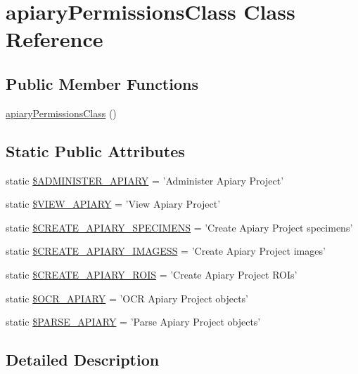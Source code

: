 \hypertarget{classapiary_permissions_class}{
\section{apiaryPermissionsClass Class Reference}
\label{classapiary_permissions_class}
}
\subsection*{Public Member Functions}
\begin{DoxyCompactItemize}
\item 
\hyperlink{classapiary_permissions_class_a2f94ec91307bd261e9f1b11ab53232b1}{apiaryPermissionsClass} ()
\end{DoxyCompactItemize}
\subsection*{Static Public Attributes}
\begin{DoxyCompactItemize}
\item 
static \hyperlink{classapiary_permissions_class_af44ec5d3163f4fde9dd5974c643d7cba}{\$ADMINISTER\_\-APIARY} = 'Administer Apiary Project'
\item 
static \hyperlink{classapiary_permissions_class_a37d9d8b791e84a572596899b5bd45e6b}{\$VIEW\_\-APIARY} = 'View Apiary Project'
\item 
static \hyperlink{classapiary_permissions_class_af8d6246e918ba9bf893ad8853638c846}{\$CREATE\_\-APIARY\_\-SPECIMENS} = 'Create Apiary Project specimens'
\item 
static \hyperlink{classapiary_permissions_class_ab519fecad8358f808167dbf208b37756}{\$CREATE\_\-APIARY\_\-IMAGESS} = 'Create Apiary Project images'
\item 
static \hyperlink{classapiary_permissions_class_a0569a7962c52e670222700a92386363c}{\$CREATE\_\-APIARY\_\-ROIS} = 'Create Apiary Project ROIs'
\item 
static \hyperlink{classapiary_permissions_class_a483814936bf3f97b10a1522d74045346}{\$OCR\_\-APIARY} = 'OCR Apiary Project objects'
\item 
static \hyperlink{classapiary_permissions_class_afb033d7a5a307633fb699003fcdf41ea}{\$PARSE\_\-APIARY} = 'Parse Apiary Project objects'
\end{DoxyCompactItemize}


\subsection{Detailed Description}



